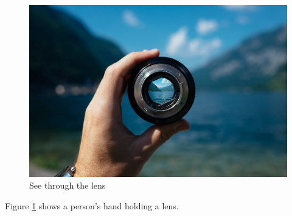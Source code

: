 \documentclass{article}
\begin{document}
	\begin{figure}
		\includegraphics*[width=\linewidth]{image.jpg}
		\caption{See through the lens}
		\label{fig:lens}
	\end{figure}
    Figure \ref{fig:lens} shows a person's hand holding a lens.
    
\end{document}
